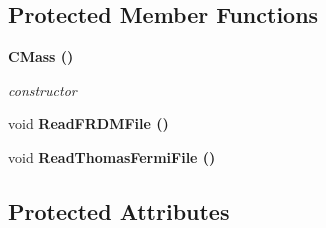 \subsection*{Protected Member Functions}
\begin{CompactItemize}
\item 
\bf{CMass} ()
\begin{CompactList}\small\item\em constructor \item\end{CompactList}\item 
void \bf{Read\-FRDMFile} ()
\item 
void \bf{Read\-Thomas\-Fermi\-File} ()
\end{CompactItemize}
\subsection*{Protected Attributes}

